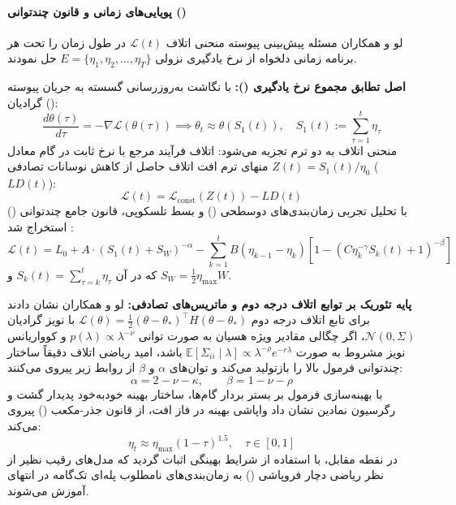 \paragraph*{پویایی‌های زمانی و قانون چندتوانی ()}
لو و همکاران \cite{luo2025multipower} مسئله پیش‌بینی پیوسته منحنی اتلاف $\mathcal{L}(t)$ در طول زمان را تحت هر برنامه زمانی دلخواه از نرخ یادگیری نزولی $E = \{\eta_1, \eta_2, \dots, \eta_T\}$ حل نمودند. 

\noindent
\textbf{اصل تطابق مجموع نرخ یادگیری ():} با نگاشت به‌روزرسانی گسسته  به جریان پیوسته گرادیان ():
\begin{equation}
    \frac{d\theta(\tau)}{d\tau} = -\nabla \mathcal{L}(\theta(\tau)) \implies \theta_t \approx \theta\left(S_1(t)\right), \quad S_1(t) := \sum_{\tau=1}^t \eta_\tau
\end{equation}
منحنی اتلاف به دو ترم تجزیه می‌شود: اتلاف فرآیند مرجع با نرخ ثابت در گام معادل $Z(t) = S_1(t)/\eta_0$ منهای ترم افت اتلاف حاصل از کاهش نوسانات تصادفی ($LD(t)$):
\begin{equation}
    \mathcal{L}(t) = \mathcal{L}_{\text{const}}(Z(t)) - LD(t)
\end{equation}
با تحلیل تجربی زمان‌بندی‌های دوسطحی () و بسط تلسکوپی، قانون جامع چندتوانی () استخراج شد \cite{luo2025multipower}:
\begin{equation}
    \mathcal{L}(t) = L_0 + A \cdot \left(S_1(t) + S_W\right)^{-\alpha} - \sum_{k=1}^t B (\eta_{k-1} - \eta_k) \left[ 1 - \left( C \eta_k^{-\gamma} S_k(t) + 1 \right)^{-\beta} \right]
\end{equation}
که در آن $S_k(t) = \sum_{\tau=k}^t \eta_\tau$ و $S_W = \frac{1}{2}\eta_{\max} W$.

\noindent
\textbf{پایه تئوریک بر توابع اتلاف درجه دوم و ماتریس‌های تصادفی:} لو و همکاران نشان دادند برای تابع اتلاف درجه دوم $\mathcal{L}(\theta) = \frac{1}{2}(\theta - \theta_*)^\top H (\theta - \theta_*)$ با نویز گرادیان $\mathcal{N}(0, \Sigma)$، اگر چگالی مقادیر ویژه هسیان به صورت توانی $p(\lambda) \propto \lambda^{-\nu}$ و کوواریانس نویز مشروط به صورت $\mathbb{E}[\Sigma_{ii} \mid \lambda] \propto \lambda^{-\rho} e^{-r\lambda}$ باشد، امید ریاضی اتلاف دقیقاً ساختار چندتوانی فرمول بالا را بازتولید می‌کند و توان‌های $\alpha$ و $\beta$ از روابط زیر پیروی می‌کنند:
\begin{equation}
    \alpha = 2 - \nu - \kappa, \qquad \beta = 1 - \nu - \rho
\end{equation}
با بهینه‌سازی فرمول  بر بستر بردار گام‌ها، ساختار بهینه  خودبه‌خود پدیدار گشت و رگرسیون نمادین نشان داد واپاشی بهینه در فاز افت، از قانون جذر-مکعب () پیروی می‌کند:
\begin{equation}
    \eta_t \approx \eta_{\max} (1 - \tau)^{1.5}, \quad \tau \in [0, 1]
\end{equation}
در نقطه مقابل، با استفاده از شرایط بهینگی  اثبات گردید که مدل‌های رقیب نظیر  \cite{tissue2024scaling} از نظر ریاضی دچار فروپاشی () به زمان‌بندی‌های نامطلوب پله‌ای تک‌گامه در انتهای آموزش می‌شوند.

